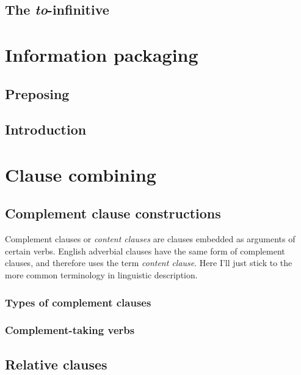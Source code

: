\documentclass[UTF8, a4paper, oneside, scheme=plain]{ctexrep}
\newcommand*{\term}[1]{\emph{#1}}
\newcommand{\corpus}[1]{\emph{#1}}
\begin{document}
\section{The \corpus{to}-infinitive}

\chapter{Information packaging}\label{chap:information-packaging}

\section{Preposing}\label{sec:information.preposing}

\section{Introduction}\label{sec:nonfinite-clause.intro}

\chapter{Clause combining}\label{chap:clause-combining}

\section{Complement clause constructions}\label{chap:complement-clause}

Complement clauses or \term{content clauses} \citep{cgel} are clauses embedded as arguments of certain verbs.
English adverbial clauses have the same form of complement clauses,
and therefore \citet{cgel} uses the term \term{content clause}.
Here I'll just stick to the more common terminology in linguistic description.

\subsection{Types of complement clauses}

\subsection{Complement-taking verbs}

\section{Relative clauses}\label{sec:relative-clause}
\end{document}
